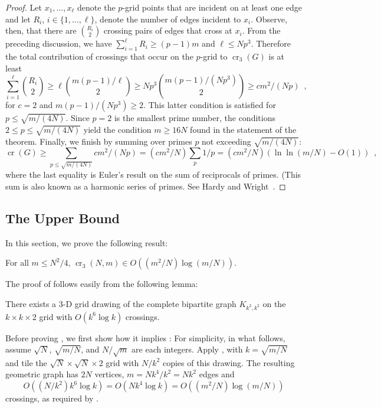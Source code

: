 \documentclass{patmorin}
\newcommand{\n}{N}
\DeclareMathOperator{\crs}{cr}
\begin{document}
\begin{proof}
  Let $x_1,\ldots,x_\ell$ denote the $p$-grid points that are incident
  on at least one edge and let $R_i$, $i\in\{1,\ldots,\ell\}$, denote
  the number of edges incident to $x_i$.  Observe, then, that there
  are $\binom{R_i}{2}$ crossing pairs of edges that cross at $x_i$.
  From the preceding discussion, we have $\sum_{i=1}^\ell R_i \ge (p-1)m$
  and $\ell\le\n p^3$.  Therefore the total contribution of crossings
  that occur on the $p$-grid to $\crs_3(G)$ is at least
  \[
      \sum_{i=1}^\ell\binom{R_i}{2} \ge \ell \binom{m(p-1)/\ell}{2}
      \ge\n p^3\binom{m(p-1)/(\n p^3)}{2} \ge cm^2/(\n p) \enspace ,
  \]
  for $c=2$ and $m(p-1)/(\n p^3) \ge 2$.  This latter condition is satisfied
  for $p \le \sqrt{m/(4\n)}$. Since $p=2$ is the smallest prime
  number, the conditions $2\le p\le\sqrt{m/(4\n)}$ yield the
  condition $m\ge 16\n$ found in the statement of the theorem. Finally,
  we finish by summing over primes $p$ not exceeding $\sqrt{m/(4\n)}$:
  \[
     \crs(G) \ge \sum_{p\le \sqrt{m/(4\n)}} cm^2/(\n p) 
             = (cm^2/\n) \sum_p 1/p 
             = (cm^2/\n)(\ln\ln(m/\n)-O(1)) \enspace ,
  \]
  where the last equality is Euler's result on the sum of reciprocals
  of primes. (This sum is also known as a harmonic series of primes.
  See Hardy and Wright~\cite[Section~22.7]{hardy.wright:introduction}.
\end{proof}

\subsection{The Upper Bound}

In this section, we prove the following result:

\begin{thm}
  For all $m\le\n^2/4$, $\crs_3(\n,m) \in O((m^2/\n)\log (m/\n))$.
\end{thm}

The proof of  follows easily from the following
lemma:
\begin{lem}
  There exists a 3-D grid drawing of the complete bipartite graph
  $K_{k^2,k^2}$ on the $k\times k\times 2$ grid with $O(k^6\log k)$
  crossings.
\end{lem}

Before proving , we first show how it implies
: For simplicity, in what follows, assume
$\sqrt{\n}$, $\sqrt{m/\n}$, and $\n/\sqrt{m}$ are each integers.
Apply , with $k=\sqrt{m/\n}$ and tile the
$\sqrt{\n}\times\sqrt{\n}\times 2$ grid with $\n/k^2$ copies of
this drawing. The resulting geometric graph has $2\n$ vertices,
$m=\n k^4/k^2=\n k^2$ edges and
\[ 
   O((\n/k^2)k^6\log k) = O(\n k^4\log k) = O((m^2/\n)\log(m/\n))
\] 
crossings, as required by .
\end{document}
